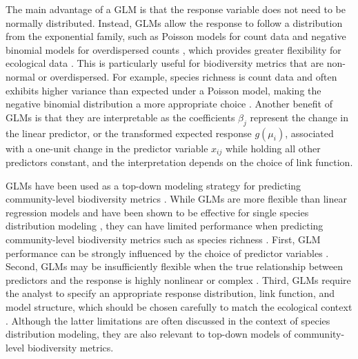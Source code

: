 The main advantage of a GLM is that the response variable does not need to be normally distributed. Instead, GLMs allow the response to follow a distribution from the exponential family, such as Poisson models for count data and negative binomial models for overdispersed counts \parencite{nelder1972, cai2023}, which provides greater flexibility for ecological data \parencite{guisan2002}. This is particularly useful for biodiversity metrics that are non-normal or overdispersed. For example, species richness is count data and often exhibits higher variance than expected under a Poisson model, making the negative binomial distribution a more appropriate choice \parencite{cai2023}. Another benefit of GLMs is that they are interpretable as the coefficients \(\beta_j\) represent the change in the linear predictor, or the transformed expected response \(g(\mu_i)\), associated with a one-unit change in the predictor variable \(x_{ij}\) while holding all other predictors constant, and the interpretation depends on the choice of link function.

GLMs have been used as a top-down modeling strategy for predicting community-level biodiversity metrics \parencite{brugere2023, cai2023, ngor2023}. While GLMs are more flexible than linear regression models and have been shown to be effective for single species distribution modeling \parencite{norberg2019}, they can have limited performance when predicting community-level biodiversity metrics such as species richness \parencite{robin2021, ngor2023, cai2023}. First, GLM performance can be strongly influenced by the choice of predictor variables \parencite{guisan2002}. Second, GLMs may be insufficiently flexible when the true relationship between predictors and the response is highly nonlinear or complex \parencite{yee_generalized_1991}. Third, GLMs require the analyst to specify an appropriate response distribution, link function, and model structure, which should be chosen carefully to match the ecological context \parencite{austin_species_2007}. Although the latter limitations are often discussed in the context of species distribution modeling, they are also relevant to top-down models of community-level biodiversity metrics.

